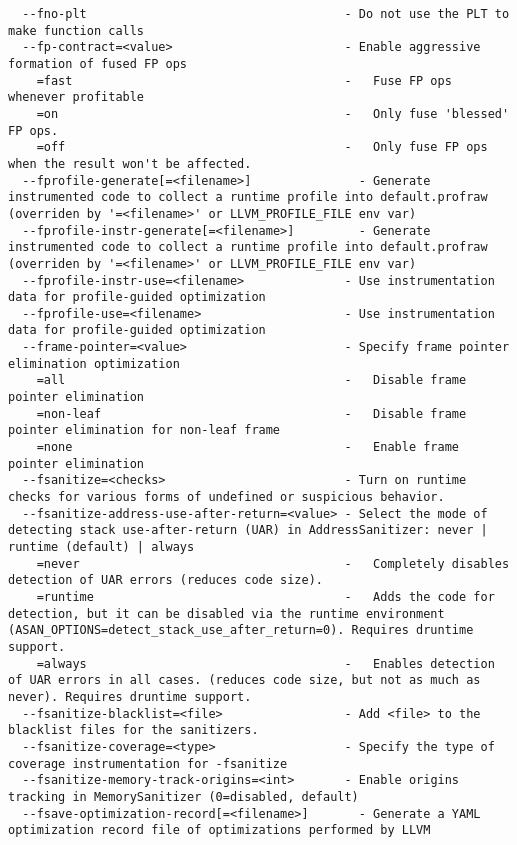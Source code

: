 \documentclass[732]{studrep}
\begin{document}
\begin{verbatim}
  --fno-plt                                    - Do not use the PLT to make function calls
  --fp-contract=<value>                        - Enable aggressive formation of fused FP ops
    =fast                                      -   Fuse FP ops whenever profitable
    =on                                        -   Only fuse 'blessed' FP ops.
    =off                                       -   Only fuse FP ops when the result won't be affected.
  --fprofile-generate[=<filename>]               - Generate instrumented code to collect a runtime profile into default.profraw (overriden by '=<filename>' or LLVM_PROFILE_FILE env var)
  --fprofile-instr-generate[=<filename>]         - Generate instrumented code to collect a runtime profile into default.profraw (overriden by '=<filename>' or LLVM_PROFILE_FILE env var)
  --fprofile-instr-use=<filename>              - Use instrumentation data for profile-guided optimization
  --fprofile-use=<filename>                    - Use instrumentation data for profile-guided optimization
  --frame-pointer=<value>                      - Specify frame pointer elimination optimization
    =all                                       -   Disable frame pointer elimination
    =non-leaf                                  -   Disable frame pointer elimination for non-leaf frame
    =none                                      -   Enable frame pointer elimination
  --fsanitize=<checks>                         - Turn on runtime checks for various forms of undefined or suspicious behavior.
  --fsanitize-address-use-after-return=<value> - Select the mode of detecting stack use-after-return (UAR) in AddressSanitizer: never | runtime (default) | always
    =never                                     -   Completely disables detection of UAR errors (reduces code size).
    =runtime                                   -   Adds the code for detection, but it can be disabled via the runtime environment (ASAN_OPTIONS=detect_stack_use_after_return=0). Requires druntime support.
    =always                                    -   Enables detection of UAR errors in all cases. (reduces code size, but not as much as never). Requires druntime support.
  --fsanitize-blacklist=<file>                 - Add <file> to the blacklist files for the sanitizers.
  --fsanitize-coverage=<type>                  - Specify the type of coverage instrumentation for -fsanitize
  --fsanitize-memory-track-origins=<int>       - Enable origins tracking in MemorySanitizer (0=disabled, default)
  --fsave-optimization-record[=<filename>]       - Generate a YAML optimization record file of optimizations performed by LLVM

\end{verbatim}
\end{document}
